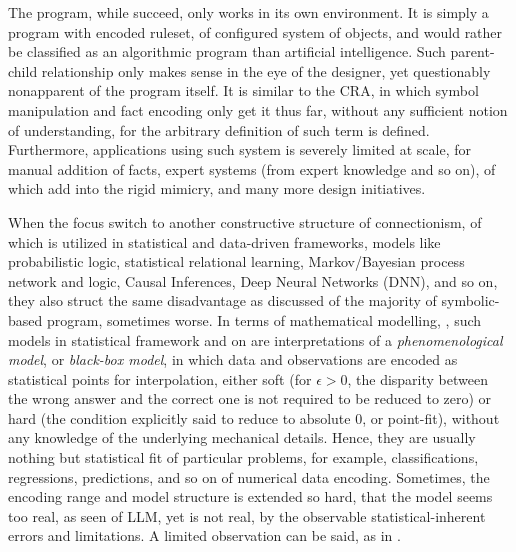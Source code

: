 The program, while succeed, only works in its own environment. It is simply a program with encoded ruleset, of configured system of objects, and would rather be classified as an algorithmic program than artificial intelligence. Such parent-child relationship only makes sense in the eye of the designer, yet questionably nonapparent of the program itself. It is similar to the CRA, in which symbol manipulation and fact encoding only get it thus far, without any sufficient notion of understanding, for the arbitrary definition of such term is defined. Furthermore, applications using such system is severely limited at scale, for manual addition of facts, expert systems (from expert knowledge and so on), of which add into the rigid mimicry, and many more design initiatives. 

When the focus switch to another constructive structure of connectionism, of which is utilized in statistical and data-driven frameworks, models like probabilistic logic, statistical relational learning, Markov/Bayesian process network and logic, Causal Inferences, Deep Neural Networks (DNN), and so on, they also struct the same disadvantage as discussed of the majority of symbolic-based program, sometimes worse. In terms of mathematical modelling, \cite{VeltenetalMathematicalModelling}, such models in statistical framework and on are interpretations of a \textit{phenomenological model}, or \textit{black-box model}, in which data and observations are encoded as statistical points for interpolation, either soft (for $\epsilon>0$, the disparity between the wrong answer and the correct one is not required to be reduced to zero) or hard (the condition explicitly said to reduce to absolute 0, or point-fit), without any knowledge of the underlying mechanical details. Hence, they are usually nothing but statistical fit of particular problems, for example, classifications, regressions, predictions, and so on of numerical data encoding. Sometimes, the encoding range and model structure is extended so hard, that the model seems too real, as seen of LLM, yet is not real, by the observable statistical-inherent errors and limitations. A limited observation can be said, as in \cite{song2025languagemodelsfailintrospect}. 

